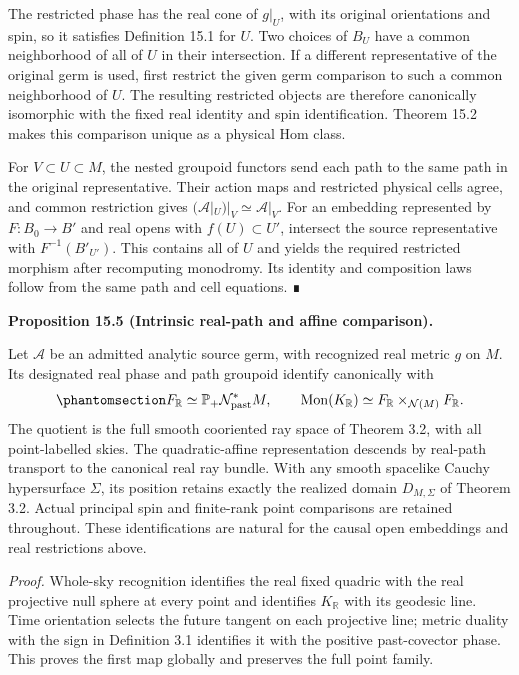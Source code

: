 \documentclass[
  english,
  11pt,
  reqno]{amsart}
\makeatletter
\newcommand{\pandocstatementheading}[1]{%
  \par\if@nobreak\else
    \addpenalty{\@beginparpenalty}%
    \addvspace{.5\baselineskip plus .2\baselineskip minus .2\baselineskip}%
  \fi
  {\normalfont\bfseries #1\par}%
  \nobreak\@afterindenttrue\@afterheading
}
\makeatother
\begin{document}
The restricted phase has the real cone of \(g|_U\), with its original
orientations and spin, so it satisfies Definition 15.1 for \(U\). Two
choices of \(B_U\) have a common neighborhood of all of \(U\) in their
intersection. If a different representative of the original germ is
used, first restrict the given germ comparison to such a common
neighborhood of \(U\). The resulting restricted objects are therefore
canonically isomorphic with the fixed real identity and spin
identification. Theorem 15.2 makes this comparison unique as a physical
Hom class.

For \(V\subset U\subset M\), the nested groupoid functors send each path
to the same path in the original representative. Their action maps and
restricted physical cells agree, and common restriction gives
\((\mathcal A|_U)|_V\simeq\mathcal A|_V\). For an embedding represented
by \(F:B_0\to B'\) and real opens with \(f(U)\subset U'\), intersect the
source representative with \(F^{-1}(B'_{U'})\). This contains all of
\(U\) and yields the required restricted morphism after recomputing
monodromy. Its identity and composition laws follow from the same path
and cell equations. ∎

\pandocstatementheading{\protect{}\label{prop:analytic-intrinsic-real-path-comparison}Proposition 15.5 (Intrinsic real-path and affine comparison).}

Let \(\mathcal A\) be an admitted analytic source germ, with recognized
real metric \(g\) on \(M\). Its designated real phase and path groupoid
identify canonically with
\begin{equation}\protect\phantomsection\label{eq:analytic-real-intrinsic-path-comparison}{
F_{\mathbb R}
\simeq \mathbb P_+\mathcal N^*_{\mathrm{past}}M,
\qquad
\operatorname{Mon}(K_{\mathbb R})
\simeq F_{\mathbb R}\times_{\mathcal N(M)}F_{\mathbb R}.
}\end{equation} The quotient is the full smooth cooriented ray space of
Theorem 3.2, with all point-labelled skies. The quadratic-affine
representation descends by real-path transport to the canonical real ray
bundle. With any smooth spacelike Cauchy hypersurface \(\Sigma\), its
position retains exactly the realized domain \(D_{M,\Sigma}\) of Theorem
3.2. Actual principal spin and finite-rank point comparisons are
retained throughout. These identifications are natural for the causal
open embeddings and real restrictions above.

\emph{Proof.} Whole-sky recognition identifies the real fixed quadric
with the real projective null sphere at every point and identifies
\(K_{\mathbb R}\) with its geodesic line. Time orientation selects the
future tangent on each projective line; metric duality with the sign in
Definition 3.1 identifies it with the positive past-covector phase. This
proves the first map globally and preserves the full point family.
\end{document}
